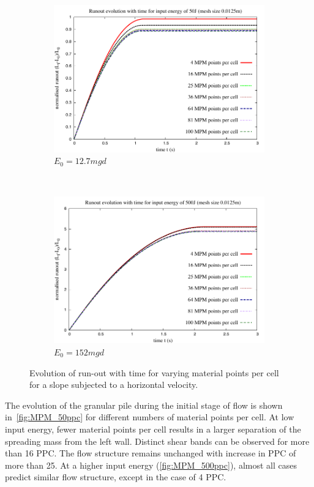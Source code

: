 \begin{figure}[tbhp]
\centering
\begin{subfigure}[b]{0.95\textwidth}
\includegraphics[width=\textwidth]{Runout_50}
\caption{$E_0=12.7mgd$}
\label{fig:Runout_50}
\end{subfigure}
\\
\begin{subfigure}[b]{0.95\textwidth}
\centering
\includegraphics[width=\textwidth]{Runout_500}
\caption{$E_0=152mgd$}
\label{fig:Runout_500}
\end{subfigure}
\caption{Evolution of run-out with time for varying material points per cell 
for a slope subjected to a horizontal velocity.}
\label{fig:Runout_MPM}
\end{figure}

The evolution of the granular pile during the initial stage of flow is shown 
in~\cref{fig:MPM_50ppc} for different numbers of material points per cell. At 
low input energy, fewer material points per cell results in a larger separation 
of the spreading mass from the left wall. Distinct shear bands can be observed 
for more than 16 PPC. The flow structure remains unchanged with increase in PPC 
of more than 25. At a higher input energy
(\cref{fig:MPM_500ppc}), almost all cases predict similar flow structure, 
except in the case of 4 PPC.

